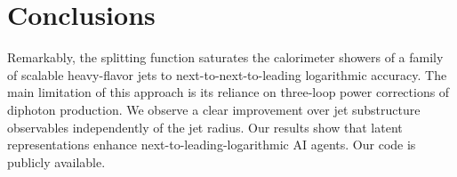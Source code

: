 \section{Conclusions}\label{sec:conclusions}

Remarkably, the splitting function saturates the calorimeter showers of
a family of scalable heavy-flavor jets to next-to-next-to-leading
logarithmic accuracy. The main limitation of this approach is its
reliance on three-loop power corrections of diphoton production. We
observe a clear improvement over jet substructure observables
independently of the jet radius. Our results show that latent
representations enhance next-to-leading-logarithmic AI agents. Our code
is publicly available.

